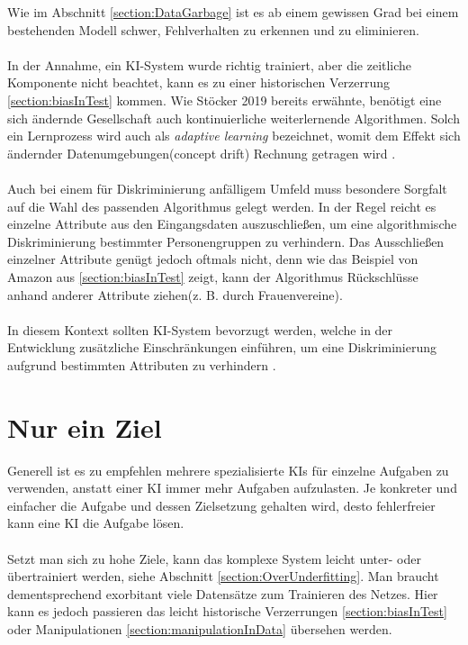 \documentclass[12pt,oneside,a4paper,parskip]{scrbook}
\begin{document}
Wie im Abschnitt \ref{section:DataGarbage} ist es ab einem gewissen Grad bei einem bestehenden Modell schwer, Fehlverhalten zu erkennen und zu eliminieren.
\\\\
In der Annahme, ein KI-System wurde richtig trainiert, aber die zeitliche Komponente nicht beachtet, kann es zu einer historischen Verzerrung \ref{section:biasInTest} kommen.
Wie Stöcker 2019 \cite{stoecker} bereits erwähnte, benötigt eine sich ändernde Gesellschaft auch kontinuierliche weiterlernende Algorithmen. Solch ein Lernprozess wird auch als \textit{adaptive learning} bezeichnet, womit dem Effekt sich ändernder Datenumgebungen(concept drift) Rechnung getragen wird \cite{gama}.%
\\\\
Auch bei einem für Diskriminierung anfälligem Umfeld muss besondere Sorgfalt auf die Wahl des passenden Algorithmus gelegt werden. In der Regel reicht es einzelne Attribute aus den Eingangsdaten auszuschließen, um eine algorithmische Diskriminierung bestimmter Personengruppen zu verhindern. Das Ausschließen einzelner Attribute genügt jedoch oftmals nicht, denn wie das Beispiel von Amazon aus \ref{section:biasInTest} zeigt, kann der Algorithmus Rückschlüsse anhand anderer Attribute ziehen(z. B. durch Frauenvereine).
\\\\
In diesem Kontext sollten KI-System bevorzugt werden, welche in der Entwicklung zusätzliche Einschränkungen einführen, um eine Diskriminierung aufgrund bestimmten Attributen zu verhindern \cite{kamiran}.

\section{Nur ein Ziel}
\label{section:oneGoal}

Generell ist es zu empfehlen mehrere spezialisierte KIs für einzelne Aufgaben zu verwenden, anstatt einer KI immer mehr Aufgaben aufzulasten. Je konkreter und einfacher die Aufgabe und dessen Zielsetzung gehalten wird, desto fehlerfreier kann eine KI die Aufgabe lösen.\\\\
Setzt man sich zu hohe Ziele, kann das komplexe System leicht unter- oder übertrainiert werden, siehe Abschnitt \ref{section:OverUnderfitting}. Man braucht dementsprechend exorbitant viele Datensätze zum Trainieren des Netzes. Hier kann es jedoch passieren das leicht historische Verzerrungen \ref{section:biasInTest} oder Manipulationen \ref{section:manipulationInData} übersehen werden.
\end{document}
